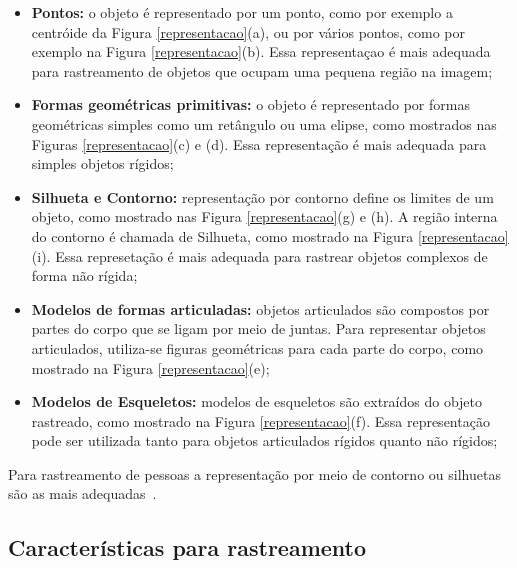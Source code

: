 	\begin{itemize}
		\item \textbf{Pontos:} o objeto é representado por um ponto, como por exemplo a centróide da Figura \ref{representacao}(a), ou por vários pontos, como por exemplo na Figura \ref{representacao}(b). Essa representaçao é mais adequada para rastreamento de objetos que ocupam uma pequena região na imagem;
		\item \textbf{Formas geométricas primitivas:} o objeto é representado por formas geométricas simples como um retângulo ou uma elipse, como mostrados nas Figuras \ref{representacao}(c) e (d). Essa representação é mais adequada para simples objetos rígidos;
		\item \textbf{Silhueta e Contorno:} representação por contorno define os limites de um objeto, como mostrado nas Figura \ref{representacao}(g) e (h). A região interna do contorno é chamada de Silhueta, como mostrado na Figura \ref{representacao}(i). Essa represetação é mais adequada para rastrear objetos complexos de forma não rígida;
		\item \textbf{Modelos de formas articuladas:} objetos articulados são compostos por partes do corpo que se ligam por meio de juntas. Para representar objetos articulados, utiliza-se figuras geométricas para cada parte do corpo, como mostrado na Figura \ref{representacao}(e);
		\item \textbf{Modelos de Esqueletos:} modelos de esqueletos são extraídos do objeto rastreado, como mostrado na Figura \ref{representacao}(f). Essa representação pode ser utilizada tanto para objetos articulados rígidos quanto não rígidos;
	\end{itemize}

	Para rastreamento de pessoas a representação por meio de contorno ou silhuetas são as mais adequadas~\cite{yilmaz}.


\subsection{Características para rastreamento}

